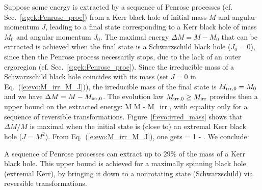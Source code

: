 Suppose some energy is extracted by a sequence of Penrose processes
(cf. Sec.~\ref{s:gek:Penrose_proc}) from a Kerr black hole of initial mass $M$ and angular momentum $J$,
leading to a final state corresponding to a Kerr black hole of mass $M_0$ and angular
momentum $J_0$. The maximal energy $\Delta M = M - M_0$ that can be extracted is achieved when the
final state is a Schwarzschild black hole ($J_0=0$), since then the Penrose process
necessarily stops, due to the lack of an outer ergoregion (cf. Sec.~\ref{s:gek:Penrose_proc}).
Since the irreducible mass of a Schwarzschild black hole coincides with its mass
(set $J=0$ in Eq.~(\ref{e:evo:M_irr_M_J})), the irreducible mass
of the final state is $M_{{\rm irr},0} = M_0$ and we have $\Delta M = M - M_{{\rm irr},0}$.
The evolution law $M_{{\rm irr},0} \geq M_{\rm irr}$ provides then a upper bound
on the extracted energy:
\be
    \Delta M \leq M - M_{\rm irr} ,
\ee
with equality only for a sequence of reversible transformations.
Figure~\ref{f:evo:irred_mass} shows that $\Delta M/M$ is maximal when the
initial state is (close to) an extremal Kerr black hole ($J=M^2$). From
Eq.~(\ref{e:evo:M_irr_M_J}), one gets
\be
    \max {} = 1 -   .
\ee
We conclude:
\begin{prop}
A sequence of Penrose processes can extract up to $29 \%$ of the mass
of a Kerr black hole. This upper bound is achieved for
a maximally spinning black hole (extremal Kerr), by bringing it down to a nonrotating
state (Schwarzschild) via reversible transformations.
\end{prop}

